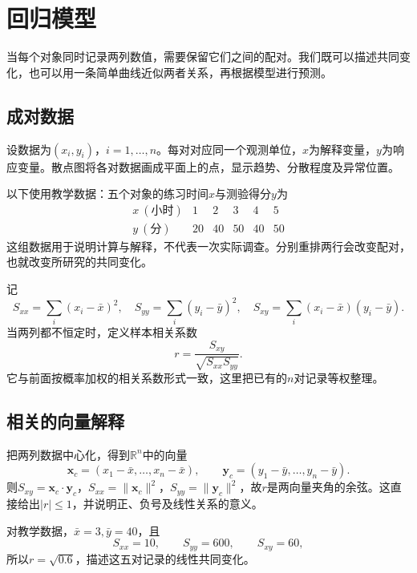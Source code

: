 \FloatBarrier
\newpage
\section{回归模型}
\label{sec:prob-regression}

当每个对象同时记录两列数值，需要保留它们之间的配对。我们既可以描述共同变化，也可以用一条简单曲线近似两者关系，再根据模型进行预测。

\subsection{成对数据}

设数据为\((x_i,y_i)\)，\(i=1,\ldots,n\)。每对对应同一个观测单位，\(x\)为解释变量，\(y\)为响应变量。散点图将各对数据画成平面上的点，显示趋势、分散程度及异常位置。

以下使用教学数据：五个对象的练习时间\(x\)与测验得分\(y\)为
\begin{equation}\label{eq:prob-regression-data}
\begin{array}{c|rrrrr}
 x\ (\text{小时})&1&2&3&4&5\\\hline
 y\ (\text{分})&20&40&50&40&50
\end{array}
\end{equation}
这组数据用于说明计算与解释，不代表一次实际调查。分别重排两行会改变配对，也就改变所研究的共同变化。

记
\[
 S_{xx}=\sum_i(x_i-\bar x)^2,\quad
 S_{yy}=\sum_i(y_i-\bar y)^2,\quad
 S_{xy}=\sum_i(x_i-\bar x)(y_i-\bar y).
\]
当两列都不恒定时，定义{\heiti 样本相关系数}
\begin{equation}\label{eq:prob-sample-correlation}
 r=\frac{S_{xy}}{\sqrt{S_{xx}S_{yy}}}.
\end{equation}
它与前面按概率加权的相关系数形式一致，这里把已有的\(n\)对记录等权整理。

\subsection{相关的向量解释}

把两列数据中心化，得到\(\mathbb R^n\)中的向量
\[
 \boldsymbol x_c=(x_1-\bar x,\ldots,x_n-\bar x),\qquad
 \boldsymbol y_c=(y_1-\bar y,\ldots,y_n-\bar y).
\]
则\(S_{xy}=\boldsymbol x_c\cdot\boldsymbol y_c\)，\(S_{xx}=\|\boldsymbol x_c\|^2\)，\(S_{yy}=\|\boldsymbol y_c\|^2\)，故\(r\)是两向量夹角的余弦。这直接给出\(|r|\le1\)，并说明正、负号及线性关系的意义。

对教学数据，\(\bar x=3,\bar y=40\)，且
\[
 S_{xx}=10,\qquad S_{yy}=600,\qquad S_{xy}=60,
\]
所以\(r=\sqrt{0.6}\)，描述这五对记录的线性共同变化。

